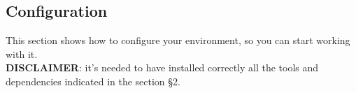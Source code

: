 \subsection{Configuration}
This section shows how to configure your environment, so you can start working with it.\\
\textbf{DISCLAIMER}: it's needed to have installed correctly all the tools and dependencies indicated in the section §2.




